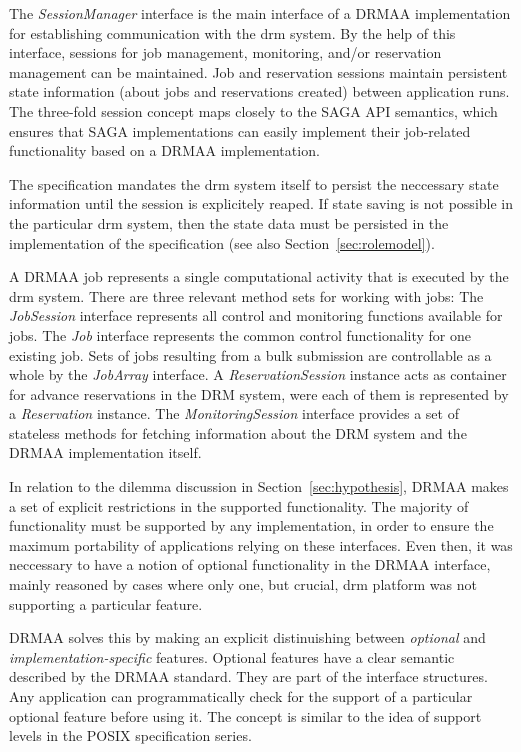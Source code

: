 \documentclass[twocolumn]{svjour3}       %
\begin{document}
The \emph{SessionManager} interface is the main interface of a DRMAA implementation for establishing communication with the \gls{drm} system. By the help of this interface, sessions for job management, monitoring, and/or reservation management can be maintained. Job and reservation sessions maintain persistent state information (about jobs and reservations created) between application runs. The three-fold session concept maps closely to the SAGA API semantics, which ensures that SAGA implementations can easily implement their job-related functionality based on a DRMAA implementation.

The specification mandates the \gls{drm} system itself to persist the neccessary state information until the session is explicitely reaped. If state saving is not possible in the particular \gls{drm} system, then the state data must be persisted in the implementation of the specification (see also Section~\ref{sec:rolemodel}). 

A DRMAA job represents a single computational activity that is executed by the \gls{drm} system. There are three relevant method sets for working with jobs: The \emph{JobSession} interface represents all control and monitoring functions available for jobs. The \emph{Job} interface represents the common control functionality for one existing job. Sets of jobs resulting from a bulk submission are controllable as a whole by the \emph{JobArray} interface. A \emph{ReservationSession} instance acts as container for advance reservations in the DRM system, were each of them is represented by a \emph{Reservation} instance. The \emph{MonitoringSession} interface provides a set of stateless methods for fetching information about the DRM system and the DRMAA implementation itself.

In relation to the dilemma discussion in Section~\ref{sec:hypothesis}, DRMAA makes a set of explicit restrictions in the supported functionality. The majority of functionality must be supported by any implementation, in order to ensure the maximum portability of applications relying on these interfaces. Even then, it was neccessary to have a notion of optional functionality in the DRMAA interface, mainly reasoned by cases where only one, but crucial, \gls{drm} platform was not supporting a particular feature. 

DRMAA solves this by making an explicit distinuishing between \emph{optional} and \emph{implementation-specific} features. Optional features have a clear semantic described by the DRMAA standard. They are part of the interface structures. Any application can programmatically check for the support of a particular optional feature before using it. The concept is similar to the idea of support levels in the POSIX specification series.
\end{document}
